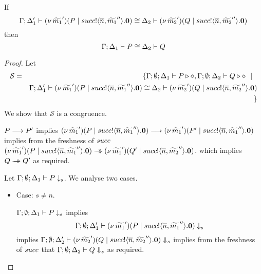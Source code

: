
\begin{lemma}[Extrusion]\rm
	\label{lem:extrusion}
	If 
	\[
		\Gamma; \Delta_1' \vdash (\nu\, \widetilde{m_1}')(P \;|\; succ ! \langle \overline{n}, \widetilde{m_1}'' \rangle . \mathbf{0}) \cong \Delta_2 \vdash (\nu\, \widetilde{m_2}')(Q \;|\; succ ! \langle \overline{n}, \widetilde{m_2}'' \rangle . \mathbf{0})
	\]
	then
	\[
		\Gamma; \Delta_1 \vdash P \cong \Delta_2 \vdash Q
	\]
\end{lemma}

\begin{proof}
	\noi Let
%
	\begin{eqnarray*}
		\mathcal{S}	&=&
					\{\Gamma; \emptyset; \Delta_1 \vdash P \triangleright \diamond, \Gamma; \emptyset; \Delta_2 \vdash Q \triangleright \diamond \ \ |\ \  \\
				& &	\Gamma; \Delta_1' \vdash (\nu\, \widetilde{m_1}')(P \;|\; succ ! \langle \overline{n}, \widetilde{m_1}'' \rangle . \mathbf{0}) \cong \Delta_2 \vdash (\nu\, \widetilde{m_2}')(Q \;|\; succ ! \langle \overline{n}, \widetilde{m_2}'' \rangle . \mathbf{0}) \\
		&&\}
	\end{eqnarray*}
%
	\noi We show that $\mathcal{S}$ is a congruence.


	\noi $P \longrightarrow P'$
	implies
	$(\nu\, \widetilde{m_1}')(P \;|\; succ ! \langle \overline{n}, \widetilde{m_1}'' \rangle . \mathbf{0}) \longrightarrow (\nu\, \widetilde{m_1}')(P' \;|\; succ ! \langle \overline{n}, \widetilde{m_1}'' \rangle . \mathbf{0})$
	implies from the freshness of $succ$
	$(\nu\, \widetilde{m_1}')(P \;|\; succ ! \langle \overline{n}, \widetilde{m_1}'' \rangle . \mathbf{0}) \rightarrow\!\!\!\!\!\rightarrow (\nu\, \widetilde{m_1}')(Q' \;|\; succ ! \langle \overline{n}, \widetilde{m_2}'' \rangle . \mathbf{0})$.
	which implies
	$Q \rightarrow\!\!\!\!\!\rightarrow Q'$ as required.


	\noi Let $\Gamma; \emptyset; \Delta_1 \vdash P \downarrow_{s}$. We analyse two cases.
    \begin{itemize}
	\item Case: $s \not= n$.

	\noi $\Gamma; \emptyset; \Delta_1 \vdash P \downarrow_{s}$
	implies
%
	\[
		\Gamma; \emptyset; \Delta_1' \vdash (\nu\, \widetilde{m_1}')(P \;|\; succ ! \langle \overline{n}, \widetilde{m_1}'' \rangle . \mathbf{0}) \downarrow_{s}
	\]
%
	\noi implies
	$\Gamma; \emptyset; \Delta_2' \vdash (\nu\, \widetilde{m_2}')(Q \;|\; succ ! \langle \overline{n}, \widetilde{m_2}'' \rangle . \mathbf{0}) \Downarrow_{s}$
	implies from the freshness of $succ$ that
	$\Gamma; \emptyset; \Delta_2 \vdash Q \Downarrow_{s}$ as required.


\end{itemize}
\end{proof}
